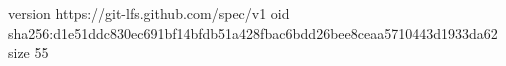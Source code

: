 version https://git-lfs.github.com/spec/v1
oid sha256:d1e51ddc830ec691bf14bfdb51a428fbac6bdd26bee8ceaa5710443d1933da62
size 55
